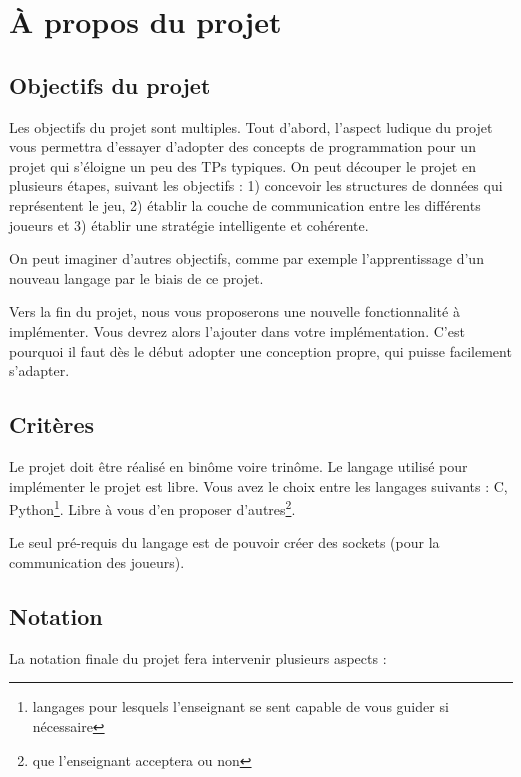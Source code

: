 \section{À propos du projet} %

\subsection{Objectifs du projet} %

Les objectifs du projet sont multiples.
Tout d'abord, l'aspect ludique du projet vous permettra d'essayer d'adopter des concepts de programmation pour un projet qui s'éloigne un peu des TPs typiques.
On peut découper le projet en plusieurs étapes, suivant les objectifs : 1) concevoir les structures de données qui représentent le jeu, 2) établir la couche de communication entre les différents joueurs et 3) établir une stratégie intelligente et cohérente.

On peut imaginer d'autres objectifs, comme par exemple l'apprentissage d'un nouveau langage par le biais de ce projet.

Vers la fin du projet, nous vous proposerons une nouvelle fonctionnalité à implémenter.
Vous devrez alors l'ajouter dans votre implémentation.
C'est pourquoi il faut dès le début adopter une conception propre, qui puisse facilement s'adapter.


\subsection{Critères} %

Le projet doit être réalisé en binôme voire trinôme.
Le langage utilisé pour implémenter le projet est libre.
Vous avez le choix entre les langages suivants : C, Python\footnote{langages pour lesquels l'enseignant se sent capable de vous guider si nécessaire}.
Libre à vous d'en proposer d'autres\footnote{que l'enseignant acceptera ou non}.

Le seul pré-requis du langage est de pouvoir créer des sockets (pour la communication des joueurs).


\subsection{Notation} %

La notation finale du projet fera intervenir plusieurs aspects :

